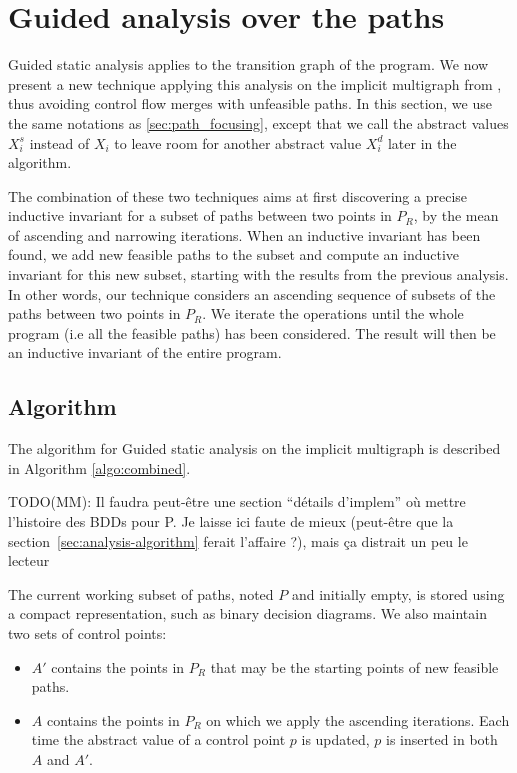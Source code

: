 \documentclass[preprint]{sigplanconf}
\newcommand{\MM}[1]{{\color{blue} TODO(MM): #1}}
\begin{document}
\section{Guided analysis over the paths}
\label{sec:guided_multigraph}

Guided static analysis \cite{DBLP:conf/sas/GopanR07} applies to the transition
graph of the program. We now present a new technique applying this analysis on the implicit
multigraph from \cite{Monniaux_Gonnord_SAS11}, thus avoiding control flow merges with
unfeasible paths.
In this section, we use the same notations as \ref{sec:path_focusing}, except
that we call the abstract values $X_i^s$ instead of $X_i$ to leave room for
another abstract value $X_i^d$ later in the algorithm.

The combination of these two techniques aims at first discovering a precise
inductive invariant for a subset of paths between two points in $P_R$, 
by the mean of ascending and narrowing iterations. When an
inductive invariant has been found, we add new feasible paths to the subset and
compute an inductive invariant for this new subset, starting with the results
from the previous analysis.
In other words, our technique considers an ascending sequence of
subsets of the paths between two points in $P_R$.
We iterate the operations until the whole program (i.e all the
feasible paths) has been considered. The result will then be an
inductive invariant of the entire program.

\subsection{Algorithm}


The algorithm for Guided static analysis on the implicit multigraph is described
in Algorithm \ref{algo:combined}.

\MM{Il faudra peut-être une section ``détails d'implem'' où mettre
  l'histoire des BDDs pour P. Je laisse ici faute de mieux (peut-être
  que la section~\ref{sec:analysis-algorithm} ferait l'affaire ?),
  mais ça distrait un peu le lecteur}

The current working subset of paths, noted $P$ and initially empty, is
stored using a compact representation, such as binary decision
diagrams. We also maintain two sets of control points:
\begin{itemize}
	\item $A'$ contains the points in $P_R$ that may be the starting points of new
		feasible paths.
	\item $A$ contains the points in $P_R$ on which we apply the ascending iterations.
	Each time the abstract value of a control point $p$ is updated, $p$ is
	inserted in both $A$ and $A'$.
\end{itemize}
\end{document}

